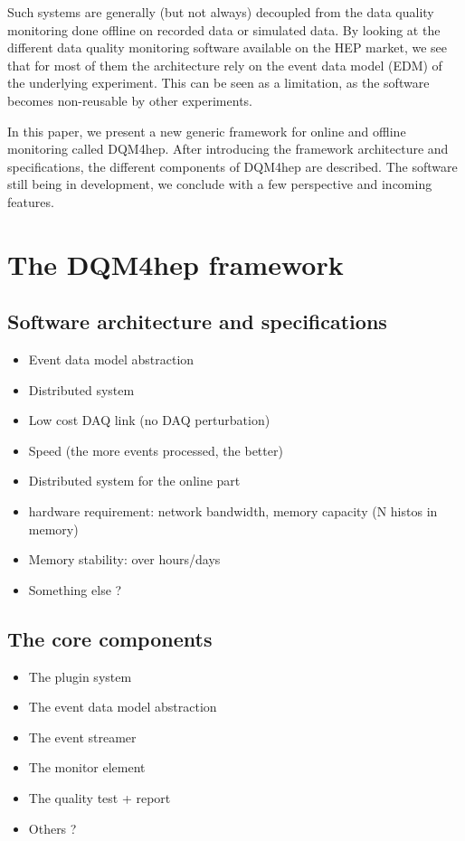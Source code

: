 \documentclass{webofc}
\begin{document}
Such systems are generally (but not always) decoupled from the data quality monitoring done offline on recorded data or simulated data. 
By looking at the different data quality monitoring software available on the HEP market, we see that for most of them the architecture rely on the event data model (EDM) of the underlying experiment. 
This can be seen as a limitation, as the software becomes non-reusable by other experiments.

In this paper, we present a new generic framework for online and offline monitoring called DQM4hep. 
After introducing the framework architecture and specifications, the different components of DQM4hep are described. 
The software still being in development, we conclude with a few perspective and incoming features.

\section{The DQM4hep framework}
\label{sec:framework}

\subsection{Software architecture and specifications}
\label{subsec:arch}



\begin{itemize}
  \item Event data model abstraction
  \item Distributed system
  \item Low cost DAQ link (no DAQ perturbation)
  \item Speed (the more events processed, the better)
  \item Distributed system for the online part
  \item hardware requirement: network bandwidth, memory capacity (N histos in memory)
  \item Memory stability: over hours/days
  \item Something else ?
\end{itemize}

\subsection{The core components}
\label{subsec:core}

\begin{itemize}
  \item The plugin system
  \item The event data model abstraction
  \item The event streamer
  \item The monitor element
  \item The quality test + report
  \item Others ?
\end{itemize}
\end{document}
